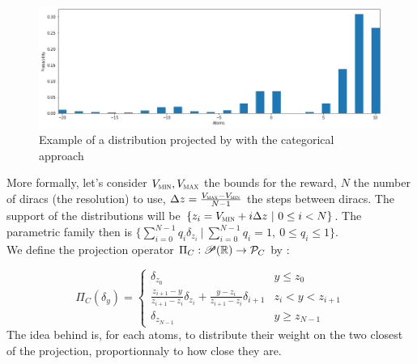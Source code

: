 \begin{figure}[!ht]
    \centering
    \includegraphics[height=0.2\textheight]{figures/personal_work/categoriacl.png}
    \caption{Example of a distribution projected by with the categorical approach}
\end{figure}

More formally, let’s consider $V_{\textsc{min}}, V_{\textsc{max}}$ the bounds for the reward, $N$ the number of diracs (the resolution) to use, $\Delta z = \frac{V_{\textsc{max}} - V_{\textsc{min}}}{N - 1}$ the steps between diracs. The support of the distributions will be $\{ z_i = V_{\textsc{\textsc{min}}} + i\Delta z \ |\ 0 \leq i < N \}$. The parametric family then is $\{ \sum_{i=0}^{N-1} q_i\delta_{z_i}  \ |\ \sum_{i=0}^{N-1} q_i = 1,\ 0\leq q_i \leq 1\}$.\\


We define the projection operator $\Pi_C : \mathscr{P}(\mathbb{R}) \rightarrow \mathcal{P}_C$ by :

\begin{equation}
    \Pi_C(\delta_y) = 
    \begin{cases}
        \delta_{z_0} & y \leq z_0\\
        \frac{z_{i+1}-y}{z_{i+1}-z_{i}}\delta_{z_i} + \frac{y - z_i}{z_{i+1}-z_{i}}\delta_{i+1} & z_i < y < z_{i+1}\\
        \delta_{z_{N-1}} & y \geq z_{N-1}
    \end{cases}
\end{equation}
The idea behind is, for each atoms, to distribute their weight on the two closest of the projection, proportionnaly to how close they are.


